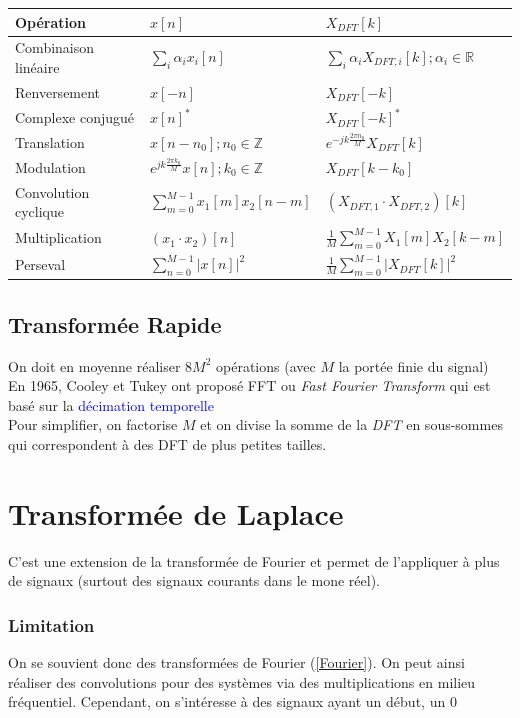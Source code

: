 \documentclass{report}
\begin{document}
\begin{center}
\begin{tabular}{| m{2cm} | m{4cm} | m{4cm} |}
\hline
Opération &$x[n]$& $X_{DFT}[k]$\\
\hline
Combinaison linéaire & $\sum_i \alpha_i x_i[n]$ & $\sum_i \alpha_i X_{DFT,i} [k]; \alpha_i \in \mathbb{R}$ \\
\hline
Renversement & $x[-n]$ & $X_{DFT}[-k]$ \\
\hline
Complexe conjugué & $x[n]^{\ast}$ & $X_{DFT}[-k]^{\ast}$\\
\hline
Translation & $x[n-n_0]; n_0 \in \mathbb{Z}$ & $e^{-jk\frac{2\pi n_0}{M}}X_{DFT}[k]$ \\
\hline
Modulation & $e^{jk\frac{2\pi k_0}{M}}x[n]; k_0 \in \mathbb{Z}$ & $X_{DFT}[k-k_0]$ \\
\hline
Convolution cyclique & $\sum_{m=0}^{M-1}x_1[m]x_2[n-m]$ & $(X_{DFT,1}\cdot X_{DFT,2})[k]$ \\
\hline
Multiplication & $(x_1 \cdot x_2)[n]$ & $\frac{1}{M} \sum_{m=0}^{M-1} X_1[m]X_2[k-m]$ \\
\hline
Perseval & $\sum_{n=0}^{M-1} |x[n]|^2$ & $\frac{1}{M}\sum_{m=0}^{M-1}|X_{DFT}[k]|^2$ \\
\hline
\end{tabular}
\end{center}


\section{Transformée Rapide}
On doit en moyenne réaliser $8M^2$ opérations (avec $M$ la portée finie du signal)\\
En 1965, Cooley et Tukey ont proposé FFT ou \textit{Fast Fourier Transform} qui est basé sur la \textcolor{blue}{décimation temporelle}\\
Pour simplifier, on factorise $M$ et on divise la somme de la \textit{DFT} en sous-sommes qui correspondent à des DFT de plus petites tailles.


\chapter{Transformée de Laplace}
C'est une extension de la transformée de Fourier et permet de l'appliquer à plus de signaux (surtout des signaux courants dans le mone réel).

\subsection{Limitation}
On se souvient donc des transformées de Fourier (\ref{Fourier}). On peut ainsi réaliser des convolutions pour des systèmes via des multiplications en milieu fréquentiel. Cependant, on s'intéresse à des signaux ayant un début, un $0$
\end{document}
